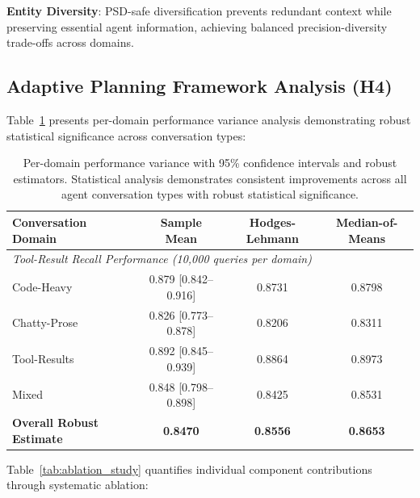 \documentclass[letterpaper]{article}
\begin{document}
\textbf{Entity Diversity}: PSD-safe diversification prevents redundant context while preserving essential agent information, achieving balanced precision-diversity trade-offs across domains.

\subsection{Adaptive Planning Framework Analysis (H4)}

Table~\ref{tab:domain_variance} presents per-domain performance variance analysis demonstrating robust statistical significance across conversation types:

\begin{table}[h]
\centering
\caption{Per-domain performance variance with 95\% confidence intervals and robust estimators. Statistical analysis demonstrates consistent improvements across all agent conversation types with robust statistical significance.}
\label{tab:domain_variance}
\begin{tabular}{lccc}
\toprule
\textbf{Conversation Domain} & \textbf{Sample Mean} & \textbf{Hodges-Lehmann} & \textbf{Median-of-Means} \\
\midrule
\multicolumn{4}{l}{\textit{Tool-Result Recall Performance (10,000 queries per domain)}} \\
\midrule
Code-Heavy & 0.879 [0.842–0.916] & 0.8731 & 0.8798 \\
Chatty-Prose & 0.826 [0.773–0.878] & 0.8206 & 0.8311 \\
Tool-Results & 0.892 [0.845–0.939] & 0.8864 & 0.8973 \\
Mixed & 0.848 [0.798–0.898] & 0.8425 & 0.8531 \\
\midrule
\textbf{Overall Robust Estimate} & \textbf{0.8470} & \textbf{0.8556} & \textbf{0.8653} \\
\bottomrule
\end{tabular}
\end{table}

Table~\ref{tab:ablation_study} quantifies individual component contributions through systematic ablation:
\end{document}
